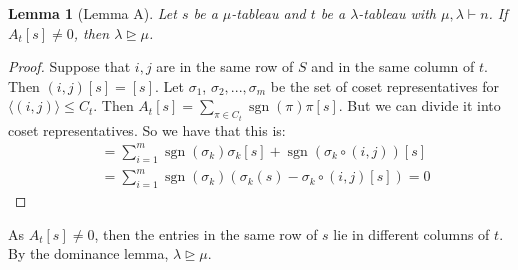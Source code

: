 \documentclass[]{report}
\newtheorem{lemma}[theorem]{Lemma}
\theoremstyle{definition}
\numberwithin{theorem}{section}
\numberwithin{equation}{section}
\newcommand{\sgn}{\operatorname{sgn}}
\begin{document}
\begin{lemma}[Lemma A]
	Let $s$ be a $\mu$-tableau and $t$ be a $\lambda$-tableau with $\mu, \lambda \vdash n$. If $A_t[s] \neq 0$, then $\lambda \unrhd \mu$. 
\end{lemma}
\begin{proof}
	Suppose that $i, j$ are in the same row of $S$ and in the same column of $t$. Then $(i, j)[s] = [s]$. Let $\sigma_1$, $\sigma_2, ..., \sigma_m$ be the set of coset representatives for $\langle (i, j) \rangle \leq C_t$. Then $A_t[s] = \sum_{\pi \in C_t} \sgn(\pi) \pi[s]$.
	But we can divide it into coset representatives. So we have that this is:
	\begin{align*}
		&= \sum_{i = 1}^m   \sgn(\sigma_k)  \sigma_k[s] + \sgn(\sigma_k \circ (i, j)) [s]\\
		&= \sum_{i = 1}^m   \sgn(\sigma_k) (\sigma_k(s) - \sigma_k \circ(i,j) [s]) = 0
	\end{align*}
\end{proof}
As $A_t[s] \neq 0$, then the entries in the same row of $s$ lie in different columns of $t$. By the dominance lemma, $\lambda \unrhd \mu$. 
\end{document}
